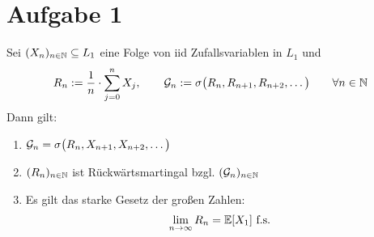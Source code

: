 \documentclass[12pt,a4paper]{article}
\author{Willi Sontopski}
\begin{document}
\section*{Aufgabe 1}
Sei $(X_n)_{n\in\mathbb{N}}\subseteq L_1$ eine Folge von iid Zufallsvariablen in $L_1$ und 
\begin{align*}
	R_n:=\frac{1}{n}\cdot\sum\limits_{j=0}^n X_j,\qquad
	\mathcal{G}_n:=\sigma\big(R_n,R_{n+1},R_{n+2},\ldots\big)\qquad\forall n\in\mathbb{N}
\end{align*}
Dann gilt:
\begin{enumerate}[label=\alph*)]
	\item $\mathcal{G}_n=\sigma\big(R_n,X_{n+1},X_{n+2},\ldots\big)$
	\item $(R_n)_{n\in\mathbb{N}}$ ist Rückwärtsmartingal bzgl. $(\mathcal{G}_n)_{n\in\mathbb{N}}$
	\item Es gilt das starke Gesetz der großen Zahlen:
	\begin{align*}
		\lim\limits_{n\to\infty} R_n=\mathbb{E}[X_1]\text{ f.s.}
	\end{align*}
\end{enumerate}
\end{document}
